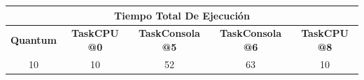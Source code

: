 \begin{center}
	\begin{tabular}{|c|c|c|c|c|}
		\hline
		\multicolumn{5}{|c|}{\textbf{Tiempo Total De Ejecución}} \\
		\hline
		\textbf{Quantum} & \textbf{TaskCPU @0} & \textbf{TaskConsola @5} & \textbf{TaskConsola @6} & \textbf{TaskCPU @8} \\
		\hline
		10 & 10 & 52 & 63 & 10 \\
		\hline
	\end{tabular}
\end{center}

